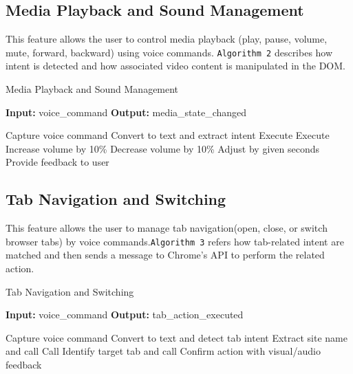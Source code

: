 \subsection{Media Playback and Sound Management}

This feature allows the user to control media playback (play, pause, volume, mute, forward, backward) using voice commands. \texttt{Algorithm 2} describes how intent is detected and how associated video content is manipulated in the DOM.

\begin{algorithm}[H]
    \caption{Media Playback and Sound Management}
    \label{alg:media_control}
    \textbf{Input:} voice\_command  
    \textbf{Output:} media\_state\_changed  
    \begin{algorithmic}[1]
        \State Capture voice command
        \State Convert to text and extract intent
            \State Execute  
            \State Execute  
            \State Increase volume by 10\% 
            \State Decrease volume by 10\% 
            \State Adjust  by given seconds 
        \EndIf
        \State Provide feedback to user
    \end{algorithmic}
\end{algorithm}

\subsection{Tab Navigation and Switching}

This feature allows the user to manage tab navigation(open, close, or switch browser tabs) by voice commands.\texttt{Algorithm 3} refers how tab-related intent are matched and then sends a message to Chrome’s API to perform the related action.

\begin{algorithm}[H]
    \caption{Tab Navigation and Switching}
    \label{alg:tab_management}
    \textbf{Input:} voice\_command  
    \textbf{Output:} tab\_action\_executed  
    \begin{algorithmic}[1]
        \State Capture voice command
        \State Convert to text and detect tab intent
            \State Extract site name and call  
            \State Call  
            \State Identify target tab and call  
        \EndIf
        \State Confirm action with visual/audio feedback
    \end{algorithmic}
\end{algorithm}



